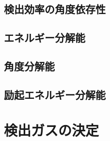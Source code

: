 \documentclass[../master]{document}
\begin{document}
\subsection{検出効率の角度依存性}
\subsection{エネルギー分解能}
\subsection{角度分解能}
\subsection{励起エネルギー分解能}

\section{検出ガスの決定}
\end{document}
